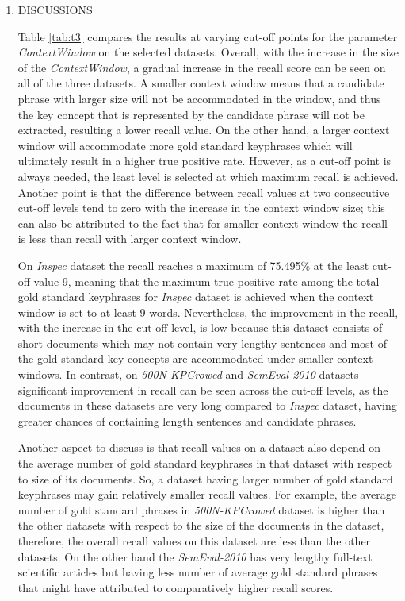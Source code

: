 \documentclass{ieeeaccess}
\begin{document}
\begin{enumerate}
	\item
{DISCUSSIONS}

Table \ref{tab:t3} compares the results at varying cut-off points for the parameter \textit{ContextWindow} on the selected datasets. Overall, with the increase in the size of the \textit{ContextWindow}, a gradual increase in the recall score can be seen on all of the three datasets. A smaller context window means that a candidate phrase with larger size will not be accommodated in the  window, and thus the key concept that is represented by the candidate phrase will not be extracted, resulting a lower  recall value. On the other hand, a larger context window will accommodate more gold standard keyphrases which will ultimately result in a higher true positive rate. However, as a cut-off point is always needed, the least level is   selected at which maximum recall is achieved. Another point is that the difference between recall values at two    consecutive cut-off levels tend to zero with the increase in the context window size; this can also be attributed to the  fact that for smaller context window the recall is less than recall with larger context window. 

\hspace{1 mm}On \textit{Inspec} dataset the recall reaches a maximum of 75.495\% at the least cut-off value 9, meaning that the maximum true positive rate among the total gold standard keyphrases for \textit{Inspec} dataset is achieved when the context window is set to at least 9 words. Nevertheless, the improvement in the recall, with the increase in the cut-off level, is low because this dataset consists of short documents which may not contain very lengthy sentences and most of the gold standard key concepts are accommodated under smaller context windows. In contrast, on \textit{500N-KPCrowed} and \textit{SemEval-2010} datasets significant improvement in recall can be seen across the cut-off levels, as the documents in these datasets are very long compared to \textit{Inspec} dataset, having greater chances of containing length sentences and candidate phrases.
		
\hspace{1 mm}Another aspect to discuss is that recall values on a dataset also depend on the average number of gold standard keyphrases in that dataset with respect to size of its documents. So, a dataset having larger number of gold standard keyphrases may gain relatively smaller recall values. For example, the average number of gold standard phrases in \textit{500N-KPCrowed} dataset is higher than the other datasets with respect to the size of the documents in the dataset, therefore,  the overall recall values on this dataset are less than the other datasets. On the other hand the \textit{SemEval-2010} has very lengthy full-text scientific articles but having less number of average gold standard phrases that might have attributed to comparatively higher recall scores.


\end{enumerate}
\end{document}
